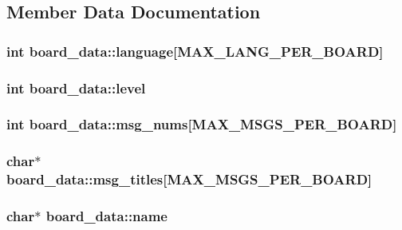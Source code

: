 \subsection{Member Data Documentation}
\hypertarget{structboard__data_aa632c5301705fb2a6769e826929639fb}{
\subsubsection[{language}]{\setlength{\rightskip}{0pt plus 5cm}int board\-\_\-data\-::language\mbox{[}{\bf M\-A\-X\-\_\-\-L\-A\-N\-G\-\_\-\-P\-E\-R\-\_\-\-B\-O\-A\-R\-D}\mbox{]}}}\label{structboard__data_aa632c5301705fb2a6769e826929639fb}
\hypertarget{structboard__data_ae35a14a68901068082fe1f310bf16a87}{
\subsubsection[{level}]{\setlength{\rightskip}{0pt plus 5cm}int board\-\_\-data\-::level}}\label{structboard__data_ae35a14a68901068082fe1f310bf16a87}
\hypertarget{structboard__data_ac4159a0b117cd7527cc11903adeb44fb}{
\subsubsection[{msg\-\_\-nums}]{\setlength{\rightskip}{0pt plus 5cm}int board\-\_\-data\-::msg\-\_\-nums\mbox{[}{\bf M\-A\-X\-\_\-\-M\-S\-G\-S\-\_\-\-P\-E\-R\-\_\-\-B\-O\-A\-R\-D}\mbox{]}}}\label{structboard__data_ac4159a0b117cd7527cc11903adeb44fb}
\hypertarget{structboard__data_adf4dc87ed1aec8daadda29f29daa1835}{
\subsubsection[{msg\-\_\-titles}]{\setlength{\rightskip}{0pt plus 5cm}char$\ast$ board\-\_\-data\-::msg\-\_\-titles\mbox{[}{\bf M\-A\-X\-\_\-\-M\-S\-G\-S\-\_\-\-P\-E\-R\-\_\-\-B\-O\-A\-R\-D}\mbox{]}}}\label{structboard__data_adf4dc87ed1aec8daadda29f29daa1835}
\hypertarget{structboard__data_acabd7c4b13eb5d67fffb95a585538d43}{
\subsubsection[{name}]{\setlength{\rightskip}{0pt plus 5cm}char$\ast$ board\-\_\-data\-::name}}\label{structboard__data_acabd7c4b13eb5d67fffb95a585538d43}
